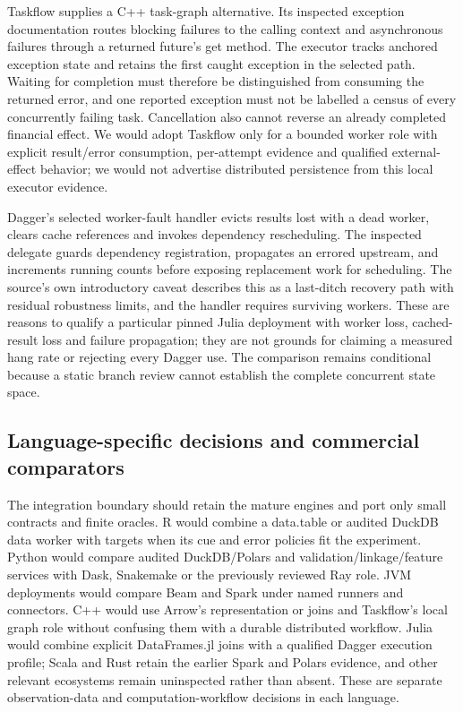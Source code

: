 Taskflow supplies a C++ task-graph alternative. Its inspected exception documentation routes blocking failures to the calling context and asynchronous failures through a returned future's get method. The executor tracks anchored exception state and retains the first caught exception in the selected path. Waiting for completion must therefore be distinguished from consuming the returned error, and one reported exception must not be labelled a census of every concurrently failing task. Cancellation also cannot reverse an already completed financial effect. We would adopt Taskflow only for a bounded worker role with explicit result/error consumption, per-attempt evidence and qualified external-effect behavior; we would not advertise distributed persistence from this local executor evidence.~\citep{exec25_dww_taskflow}

Dagger's selected worker-fault handler evicts results lost with a dead worker, clears cache references and invokes dependency rescheduling. The inspected delegate guards dependency registration, propagates an errored upstream, and increments running counts before exposing replacement work for scheduling. The source's own introductory caveat describes this as a last-ditch recovery path with residual robustness limits, and the handler requires surviving workers. These are reasons to qualify a particular pinned Julia deployment with worker loss, cached-result loss and failure propagation; they are not grounds for claiming a measured hang rate or rejecting every Dagger use. The comparison remains conditional because a static branch review cannot establish the complete concurrent state space.~\citep{exec25_dww_dagger}

\subsection{Language-specific decisions and commercial comparators}

The integration boundary should retain the mature engines and port only small contracts and finite oracles. R would combine a data.table or audited DuckDB data worker with targets when its cue and error policies fit the experiment. Python would compare audited DuckDB/Polars and validation/linkage/feature services with Dask, Snakemake or the previously reviewed Ray role. JVM deployments would compare Beam and Spark under named runners and connectors. C++ would use Arrow's representation or joins and Taskflow's local graph role without confusing them with a durable distributed workflow. Julia would combine explicit DataFrames.jl joins with a qualified Dagger execution profile; Scala and Rust retain the earlier Spark and Polars evidence, and other relevant ecosystems remain uninspected rather than absent. These are separate observation-data and computation-workflow decisions in each language.~\citep{exec25_dww_datatable,exec25_dww_targets,exec25_dww_dask,exec25_dww_snakemake,exec25_dww_beam,exec25_dww_arrow,exec25_dww_taskflow,exec25_dww_dataframes,exec25_dww_dagger,exec25_otm_spark,exec25_otm_polars,exec25_dww_choice}

